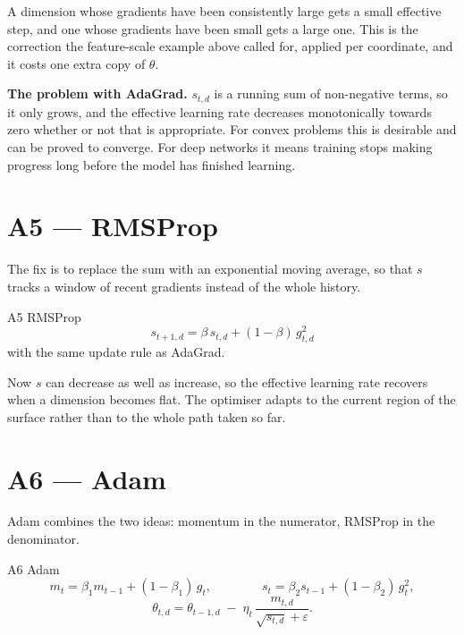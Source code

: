 \documentclass[11pt]{article}
\begin{document}
\noindent
A dimension whose gradients have been consistently large gets a small effective step, and
one whose gradients have been small gets a large one. This is the correction the
feature-scale example above called for, applied per coordinate, and it costs one extra copy
of $\theta$.

\begin{asidebox}
\textbf{The problem with AdaGrad.} $s_{t,d}$ is a running sum of non-negative terms, so
it only grows, and the effective learning rate decreases monotonically towards zero
whether or not that is appropriate. For convex problems this is desirable and can be
proved to converge. For deep networks it means training stops making progress long before
the model has finished learning.
\end{asidebox}

\section{A5 --- RMSProp}

The fix is to replace the sum with an exponential moving average, so that $s$ tracks a
window of recent gradients instead of the whole history.

\begin{algbox}{A5 \; RMSProp}
\[
  s_{t+1,d} = \beta\, s_{t,d} + (1-\beta)\, g_{t,d}^{2}
\]
with the same update rule as AdaGrad.
\end{algbox}

\noindent
Now $s$ can decrease as well as increase, so the effective learning rate recovers when a
dimension becomes flat. The optimiser adapts to the current region of the surface rather
than to the whole path taken so far.

\section{A6 --- Adam}

Adam combines the two ideas: momentum in the numerator, RMSProp in the denominator.

\begin{algbox}{A6 \; Adam}
\[
  m_{t} = \beta_{1} m_{t-1} + (1-\beta_{1})\, g_{t},
  \qquad\qquad
  s_{t} = \beta_{2} s_{t-1} + (1-\beta_{2})\, g_{t}^{2},
\]
\[
  \theta_{t,d} = \theta_{t-1,d}
  \;-\;
  \eta_{t}\, \frac{m_{t,d}}{\sqrt{s_{t,d}} + \varepsilon}.
\]
\end{algbox}
\end{document}
